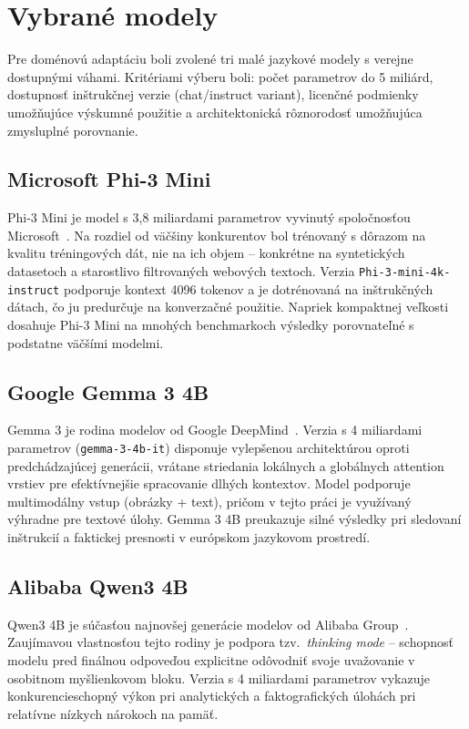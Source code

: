 \section{Vybrané modely}

Pre doménovú adaptáciu boli zvolené tri malé jazykové modely s verejne dostupnými váhami. Kritériami výberu boli: počet parametrov do 5 miliárd, dostupnosť inštrukčnej verzie (chat/instruct variant), licenčné podmienky umožňujúce výskumné použitie a architektonická rôznorodosť umožňujúca zmysluplné porovnanie.

\subsection{Microsoft Phi-3 Mini}

Phi-3 Mini je model s 3,8 miliardami parametrov vyvinutý spoločnosťou Microsoft~\cite{Phi3TechReport}. Na rozdiel od väčšiny konkurentov bol trénovaný s dôrazom na kvalitu tréningových dát, nie na ich objem -- konkrétne na syntetických datasetoch a starostlivo filtrovaných webových textoch. Verzia \texttt{Phi-3-mini-4k-instruct} podporuje kontext 4096 tokenov a je dotrénovaná na inštrukčných dátach, čo ju predurčuje na konverzačné použitie. Napriek kompaktnej veľkosti dosahuje Phi-3 Mini na mnohých benchmarkoch výsledky porovnateľné s podstatne väčšími modelmi.

\subsection{Google Gemma 3 4B}

Gemma 3 je rodina modelov od Google DeepMind~\cite{Gemma3TechReport}. Verzia s 4 miliardami parametrov (\texttt{gemma-3-4b-it}) disponuje vylepšenou architektúrou oproti predchádzajúcej generácii, vrátane striedania lokálnych a globálnych attention vrstiev pre efektívnejšie spracovanie dlhých kontextov. Model podporuje multimodálny vstup (obrázky + text), pričom v tejto práci je využívaný výhradne pre textové úlohy. Gemma 3 4B preukazuje silné výsledky pri sledovaní inštrukcií a faktickej presnosti v európskom jazykovom prostredí.

\subsection{Alibaba Qwen3 4B}

Qwen3 4B je súčasťou najnovšej generácie modelov od Alibaba Group~\cite{Qwen3TechReport}. Zaujímavou vlastnosťou tejto rodiny je podpora tzv.\ \emph{thinking mode} -- schopnosť modelu pred finálnou odpoveďou explicitne odôvodniť svoje uvažovanie v osobitnom myšlienkovom bloku. Verzia s 4 miliardami parametrov vykazuje konkurencieschopný výkon pri analytických a faktografických úlohách pri relatívne nízkych nárokoch na pamäť.


